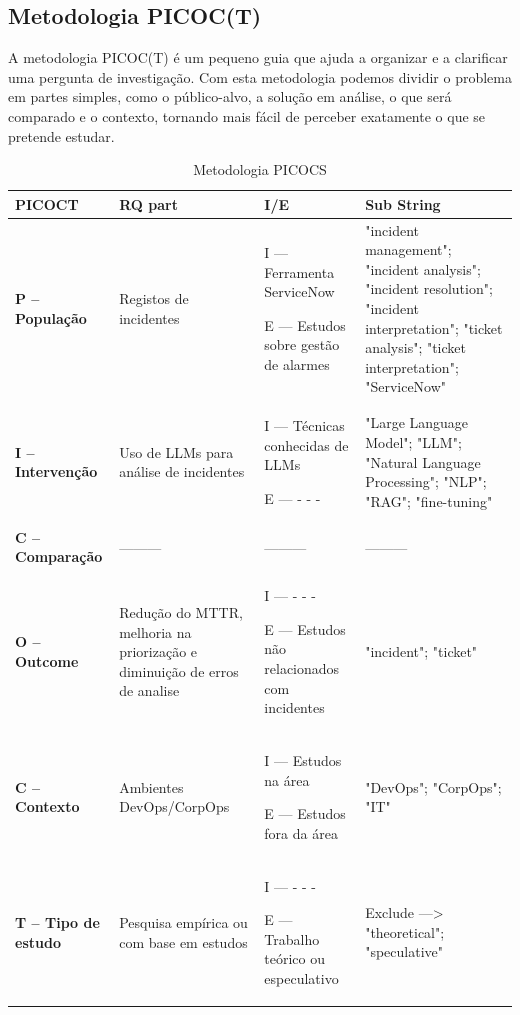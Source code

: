 	\subsection{Metodologia PICOC(T)}
		A metodologia PICOC(T) é um pequeno guia que ajuda a organizar e a clarificar uma pergunta de investigação. Com esta metodologia podemos dividir o problema em partes simples, como o público-alvo, a solução em análise, o que será comparado e o contexto, tornando mais fácil de perceber exatamente o que se pretende estudar.
		
		\begin{table}[htbp]
			\centering
			\begin{tabular}{|l|p{3cm}|p{3cm}|p{4cm}|}
				\hline
				\textbf{PICOCT} & \textbf{RQ part} & \textbf{I/E} & \textbf{Sub String} \\
				\hline
				\textbf{P – População} & Registos de incidentes & I — Ferramenta ServiceNow\newline 
				
				E — Estudos sobre gestão de alarmes & "incident management"; "incident analysis"; "incident resolution"; "incident interpretation"; "ticket analysis"; "ticket interpretation"; "ServiceNow" \\
				\hline
				\textbf{I – Intervenção} & Uso de LLMs para análise de incidentes & I — Técnicas conhecidas de LLMs\newline
				
				E — - - - & "Large Language Model"; "LLM"; "Natural Language Processing"; "NLP"; "RAG"; "fine-tuning" \\
				\hline
				\textbf{C – Comparação} & ——— & ——— & ——— \\
				\hline
				\textbf{O – Outcome} & Redução do MTTR, melhoria na priorização e diminuição de erros de analise & I — - - -\newline
				
				E — Estudos não relacionados com incidentes & "incident"; "ticket" \\
				\hline
				\textbf{C – Contexto} & Ambientes DevOps/CorpOps & I — Estudos na área\newline
				
				E — Estudos fora da área & "DevOps"; "CorpOps"; "IT"\\
				\hline
				\textbf{T – Tipo de estudo} & Pesquisa empírica ou com base em estudos & I — - - -\newline
				
				E — Trabalho teórico ou especulativo & Exclude —> "theoretical"; "speculative" \\
				\hline
			\end{tabular}
			\caption{Metodologia PICOCS}
			\label{tab:picocs}
		\end{table}


